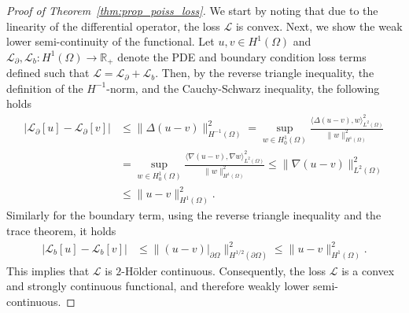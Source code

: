 \documentclass[pdflatex]{sn-jnl}%
\begin{document}
\vspace{-0em}\begin{proof}[Proof of Theorem~\ref{thm:prop_poiss_loss}]
We start by noting that due to the linearity of the differential operator, the loss $\mathcal{L}$ is convex. Next, we show the weak lower semi-continuity of the functional. 
Let $u,v\in H^1(\Omega)$ and $\mathcal{L}_\partial,\mathcal{L}_b:H^1(\Omega)\rightarrow \mathbb{R}_+$ denote the PDE and boundary condition loss terms defined such that $\mathcal{L}=\mathcal{L}_\partial+\mathcal{L}_b$. Then, by the reverse triangle inequality, the definition of the $H^{-1}$-norm, and the Cauchy-Schwarz inequality, the following holds
\begin{equation}\label{eq:H-1_ineq}
\begin{aligned}
    \left|\mathcal{L}_\partial[u]-\mathcal{L}_\partial[v]\right|&\leq \|\Delta (u-v)\|_{H^{-1}(\Omega)}^2
    = \sup\limits_{w\in H^1_0(\Omega)}\frac{\langle \Delta (u-v), w\rangle_{L^2(\Omega)}^2}{\|w\|_{H^1(\Omega)}^2}\\&
    = \sup\limits_{w\in H^1_0(\Omega)}\frac{\langle \nabla (u-v), \nabla w\rangle_{L^2(\Omega)}^2}{\|w\|_{H^1(\Omega)}^2}\leq \|\nabla(u-v)\|_{L^2(\Omega)}^2\\&
    \leq \|u-v\|_{H^1(\Omega)}^2.
\end{aligned}
\end{equation}
Similarly for the boundary term, using the reverse triangle inequality and the trace theorem, it holds
\begin{align*}
    \left|\mathcal{L}_b[u]-\mathcal{L}_b[v]\right|&\leq \|(u-v)|_{\partial\Omega}\|_{H^{1/2}(\partial\Omega)}^2\leq \|u-v\|_{H^1(\Omega)}^2.
\end{align*}
This implies that $\mathcal{L}$ is $2$-H\"older continuous. Consequently, the loss $\mathcal{L}$ is a convex and strongly continuous functional, and therefore weakly lower semi-continuous. 

\end{proof}
\end{document}
